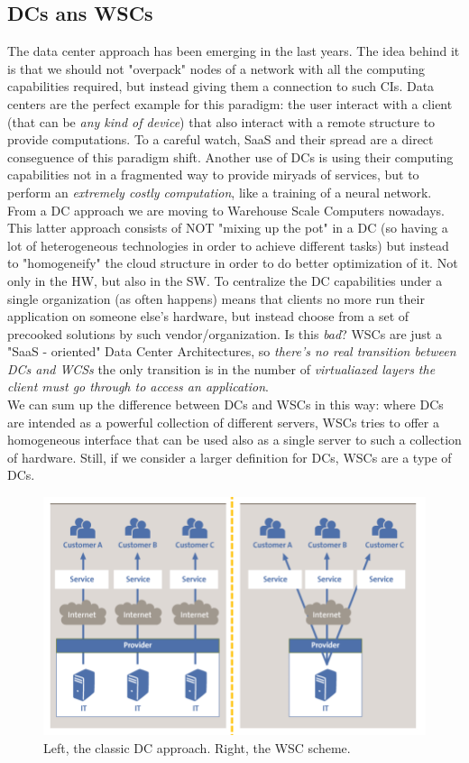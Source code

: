 \documentclass{article}
\begin{document}
			\subsection{DCs ans WSCs}
				The data center approach has been emerging in the last years. The idea behind it is that we should not "overpack" nodes of a network with all the computing capabilities required, but instead giving them a connection to such CIs. Data centers are the perfect example for this paradigm: the user interact with a client (that can be \emph{any kind of device}) that also interact with a remote structure to provide computations. To a careful watch, SaaS and their spread are a direct conseguence of this paradigm shift. Another use of DCs is using their computing capabilities not in a fragmented way to provide miryads of services, but to perform an \emph{extremely costly computation}, like a training of a neural network.\\
				From a DC approach we are moving to Warehouse Scale Computers nowadays. This latter approach consists of NOT "mixing up the pot" in a DC (so having a lot of heterogeneous technologies in order to achieve different tasks) but instead to "homogeneify" the cloud structure in order to do better optimization of it. Not only in the HW, but also in the SW. To centralize the DC capabilities under a single organization (as often happens) means that clients no more run their application on someone else's hardware, but instead choose from a set of precooked solutions by such vendor/organization. Is this \emph{bad}? WSCs are just a "SaaS - oriented" Data Center Architectures, so \emph{there's no real transition between DCs and WCSs} the only transition is in the number of \emph{virtualiazed layers the client must go through to access an application}.\\
				We can sum up the difference between DCs and WSCs in this way: where DCs are intended as a powerful collection of different servers, WSCs tries to offer a homogeneous interface that can be used also as a single server to such a collection of hardware. Still, if we consider a larger definition for DCs, WSCs are a type of DCs. 
				\begin{figure}[H]
					\centering
					\includegraphics[width = \textwidth]{./images/wsc.png}
					\caption{Left, the classic DC approach. Right, the WSC scheme.}
				\end{figure}
				
\end{document}
